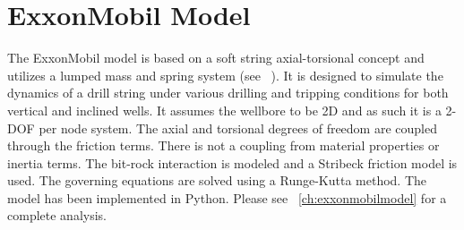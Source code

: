 \section{ExxonMobil Model}
The ExxonMobil model is based on a soft string axial-torsional concept and utilizes a lumped mass and spring system (see ~\cite{ref:dixit2021a}). It is designed to simulate the dynamics of a drill string under various drilling and tripping conditions for both vertical and inclined wells. It assumes the wellbore to be 2D and as such it is a 2-DOF per node system. The axial and torsional degrees of freedom are coupled through the friction terms. There is not a coupling from material properties or inertia terms.  The bit-rock interaction is modeled and a Stribeck friction model is used. The governing equations are solved using a Runge-Kutta method. The model has been implemented in Python.  Please see \chaptername~\ref{ch:exxonmobilmodel} for a complete analysis. 